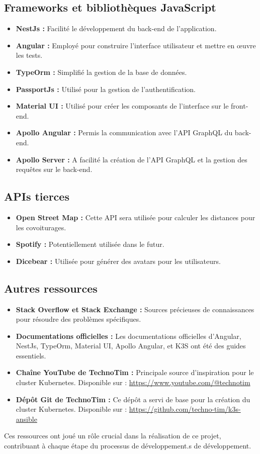 \subsection{Frameworks et bibliothèques JavaScript}\label{subsec:frameworks}
\begin{itemize}
    \item \textbf{NestJs :} Facilité le développement du back-end de l'application.
    \item \textbf{Angular :} Employé pour construire l'interface utilisateur et mettre en œuvre les tests.
    \item \textbf{TypeOrm :} Simplifié la gestion de la base de données.
    \item \textbf{PassportJs :} Utilisé pour la gestion de l'authentification.
    \item \textbf{Material UI :} Utilisé pour créer les composants de l'interface sur le front-end.
    \item \textbf{Apollo Angular :} Permis la communication avec l'API GraphQL du back-end.
    \item \textbf{Apollo Server :} A facilité la création de l'API GraphQL et la gestion des requêtes sur le back-end.
\end{itemize}

\subsection{APIs tierces}\label{subsec:apis-tierces}
\begin{itemize}
    \item \textbf{Open Street Map :} Cette API sera utilisée pour calculer les distances pour les covoiturages.
    \item \textbf{Spotify :} Potentiellement utilisée dans le futur.
    \item \textbf{Dicebear :} Utilisée pour générer des avatars pour les utilisateurs.
\end{itemize}

\subsection{Autres ressources}\label{subsec:autres-ressources}
\begin{itemize}
    \item \textbf{Stack Overflow et Stack Exchange :} Sources précieuses de connaissances pour résoudre des problèmes spécifiques.
    \item \textbf{Documentations officielles :} Les documentations officielles d'Angular, NestJs, TypeOrm, Material UI, Apollo Angular, et K3S ont été des guides essentiels.
    \item \textbf{Chaîne YouTube de TechnoTim :} Principale source d'inspiration pour le cluster Kubernetes.
    Disponible sur : \url{https://www.youtube.com/@technotim}
    \item \textbf{Dépôt Git de TechnoTim :} Ce dépôt a servi de base pour la création du cluster Kubernetes.
    Disponible sur : \url{https://github.com/techno-tim/k3s-ansible}
\end{itemize}

Ces ressources ont joué un rôle crucial dans la réalisation de ce projet, contribuant à chaque étape du processus de développement.s de développement.